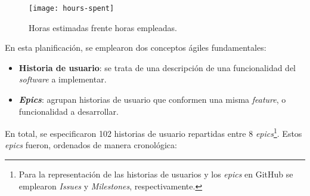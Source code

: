 \begin{figure}[h]
	\centering
	\texttt{[image: hours-spent]}
	\caption{Horas estimadas frente horas empleadas.}
\end{figure}

En esta planificación, se emplearon dos conceptos ágiles fundamentales:

\vspace{-0.3cm}
\begin{itemize}[\textbullet]
	\item \textbf{Historia de usuario}: se trata de una descripción de una funcionalidad del \emph{software} a implementar.
	\item \textbf{\emph{Epics}}: agrupan historias de usuario que conformen una misma \emph{feature}, o funcionalidad a desarrollar.
\end{itemize}

\vspace{-0.2cm}
En total, se especificaron 102 historias de usuario repartidas entre 8 \emph{epics}\footnote{Para la representación de las historias de usuarios y los \emph{epics} en GitHub se emplearon \emph{Issues} y \emph{Milestones}, respectivamente.}. Estos \emph{epics} fueron, ordenados de manera cronológica:

